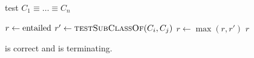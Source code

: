 \documentclass[paper.tex]{subfiles}
\begin{document}
\begin{algorithm}[H]
  \caption{test $C_1 \equiv \ldots \equiv C_n$}
  \begin{algorithmic}[1]
    \raggedright
      \State $r \gets \mathrm{entailed}$
          \State $r' \gets \Call{testSubClassOf}{C_i, C_j}$
          \label{alg:testEquivalentClasses:inner}
          \State $r \gets \max(r, r')$
        \EndFor
      \EndFor
      \State \Return $r$
    \EndFunction
  \end{algorithmic}
\end{algorithm}

\begin{theorem}
   is correct and is terminating.
\end{theorem}
\end{document}
